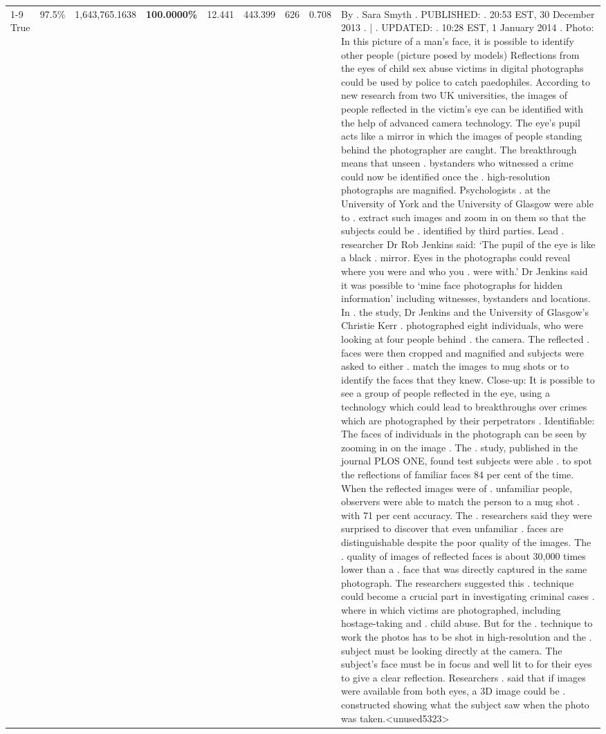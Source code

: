 \begin{table}[H]
\begin{tabular}{lllrlllll}
\cline{1-9}
True & 97.5\% & 1,643,765.1638 & \bfseries \color{red} 100.0000\% & 12.441 & 443.399 & 626 & 0.708 & By . Sara Smyth . PUBLISHED: . 20:53 EST, 30 December 2013 . | . UPDATED: . 10:28 EST, 1 January 2014 . Photo: In this picture of a man's face, it is possible to identify other people (picture posed by models) Reflections from the eyes of child sex abuse victims in digital photographs could be used by police to catch paedophiles. According to new research from two UK universities, the images of people reflected in the victim's eye can be identified with the help of advanced camera technology. The eye's pupil acts like a mirror in which the images of people standing behind the photographer are caught. The breakthrough means that unseen . bystanders who witnessed a crime could now be identified once the . high-resolution photographs are magnified. Psychologists . at the University of York and the University of Glasgow were able to . extract such images and zoom in on them so that the subjects could be . identified by third parties. Lead . researcher Dr Rob Jenkins said: ‘The pupil of the eye is like a black . mirror. Eyes in the photographs could reveal where you were and who you . were with.' Dr Jenkins said it was possible to ‘mine face photographs for hidden information' including witnesses, bystanders and locations. In . the study, Dr Jenkins and the University of Glasgow's Christie Kerr . photographed eight individuals, who were looking at four people behind . the camera. The reflected . faces were then cropped and magnified and subjects were asked to either . match the images to mug shots or to identify the faces that they knew. Close-up: It is possible to see a group of people reflected in the eye, using a technology which could lead to breakthroughs over crimes which are photographed by their perpetrators . Identifiable: The faces of individuals in the photograph can be seen by zooming in on the image . The . study, published in the journal PLOS ONE, found test subjects were able . to spot the reflections of familiar faces 84 per cent of the time. When the reflected images were of . unfamiliar people, observers were able to match the person to a mug shot . with 71 per cent accuracy. The . researchers said they were surprised to discover that even unfamiliar . faces are distinguishable despite the poor quality of the images. The . quality of images of reflected faces is about 30,000 times lower than a . face that was directly captured in the same photograph. The researchers suggested this . technique could become a crucial part in investigating criminal cases . where in which victims are photographed, including hostage-taking and . child abuse. But for the . technique to work the photos has to be shot in high-resolution and the . subject must be looking directly at the camera. The subject's face must be in focus and well lit to for their eyes to give a clear reflection. Researchers . said that if images were available from both eyes, a 3D image could be . constructed showing what the subject saw when the photo was taken.<unused5323> \\

\end{tabular}
\end{table}
